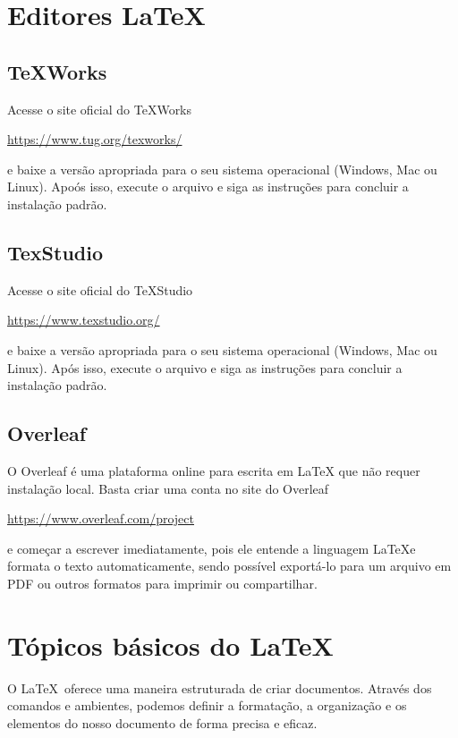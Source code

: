 \section{Editores LaTeX}
\label{sec:3}
\subsection{TeXWorks}
\noindent Acesse o site oficial do TeXWorks 
\begin{center}
\url{https://www.tug.org/texworks/}    
\end{center}
\noindent  e baixe a vers\~ao apropriada para o seu sistema operacional (Windows, Mac ou Linux). Apo\'os isso, execute o arquivo e siga as instru\c c\~oes para concluir a instala\c c\~ao padr\~ao.

\subsection{TexStudio}
Acesse o site oficial do TeXStudio
\begin{center}
\url{https://www.texstudio.org/}   
\end{center}
e baixe a vers\~ao apropriada para o seu sistema operacional (Windows, Mac ou Linux). Ap\'os isso, execute o arquivo e siga as instru\c c\~oes para concluir a instala\c c\~ao padr\~ao.
\subsection{Overleaf}
O Overleaf é uma plataforma online para escrita em LaTeX que não requer instala\c c\~ao local. Basta criar uma conta no site do Overleaf 
\begin{center}
    \url{https://www.overleaf.com/project}
\end{center}
e começar a escrever imediatamente, pois ele entende a linguagem \LaTeX e formata o texto automaticamente, sendo possível exportá-lo para um arquivo em PDF ou outros formatos para imprimir ou compartilhar.
\section{T\'opicos b\'asicos do LaTeX}
\label{sec:4}
O \LaTeX\ oferece uma maneira estruturada de criar documentos. Atrav\'es dos comandos e ambientes, podemos definir a formata\c c\~ao, a organiza\c c\~ao e os elementos do nosso documento de forma precisa e eficaz.

